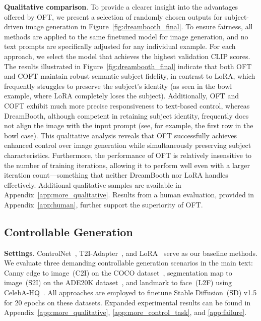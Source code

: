 \textbf{Qualitative comparison}. To provide a clearer insight into the advantages offered by OFT, we present a selection of randomly chosen outputs for subject-driven image generation in Figure~\ref{fig:dreambooth_final}. To ensure fairness, all methods are applied to the same finetuned model for image generation, and no text prompts are specifically adjusted for any individual example. For each approach, we select the model that achieves the highest validation CLIP scores. The results illustrated in Figure~\ref{fig:dreambooth_final} indicate that both OFT and COFT maintain robust semantic subject fidelity, in contrast to LoRA, which frequently struggles to preserve the subject’s identity (as seen in the bowl example, where LoRA completely loses the subject). Additionally, OFT and COFT exhibit much more precise responsiveness to text-based control, whereas DreamBooth, although competent in retaining subject identity, frequently does not align the image with the input prompt (see, for example, the first row in the bowl case). This qualitative analysis reveals that OFT successfully achieves enhanced control over image generation while simultaneously preserving subject characteristics. Furthermore, the performance of OFT is relatively insensitive to the number of training iterations, allowing it to perform well even with a larger iteration count—something that neither DreamBooth nor LoRA handles effectively. Additional qualitative samples are available in Appendix~\ref{app:more_qualitative}. Results from a human evaluation, provided in Appendix~\ref{app:human}, further support the superiority of OFT.

\subsection{Controllable Generation}

\textbf{Settings}. ControlNet~\cite{zhang2023adding}, T2I-Adapter~\cite{mou2023t2i}, and LoRA~\cite{hulora2022} serve as our baseline methods. We evaluate three demanding controllable generation scenarios in the main text: Canny edge to image~(C2I) on the COCO dataset~\cite{lin2014microsoft}, segmentation map to image~(S2I) on the ADE20K dataset~\cite{zhou2017scene}, and landmark to face~(L2F) using CelebA-HQ~\cite{karras2018progressive,xia2021tedigan}. All approaches are employed to finetune Stable Diffusion~(SD) v1.5 for 20 epochs on these datasets. Expanded experimental results can be found in Appendix~\ref{app:more_qualitative}, \ref{app:more_control_task}, and \ref{app:failure}.

